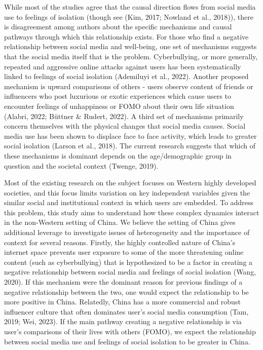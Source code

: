 \documentclass[]{interact}
\theoremstyle{plain}%
\theoremstyle{definition}
\theoremstyle{remark}
\begin{document}
While most of the studies agree that the causal direction flows from
social media use to feelings of isolation (though see (Kim, 2017;
Nowland et al., 2018)), there is disagreement among authors about the
specific mechanisms and causal pathways through which this relationship
exists. For those who find a negative relationship between social media
and well-being, one set of mechanisms suggests that the social media
itself that is the problem. Cyberbullying, or more generally, repeated
and aggressive online attacks against users has been systematically
linked to feelings of social isolation (Ademiluyi et al., 2022). Another
proposed mechanism is upward comparisons of others - users observe
content of friends or influencers who post luxurious or exotic
experiences which cause users to encounter feelings of unhappiness or
FOMO about their own life situation (Alabri, 2022; Büttner \& Rudert,
2022). A third set of mechanisms primarily concern themselves with the
physical changes that social media causes. Social media use has been
shown to displace face to face activity, which leads to greater social
isolation (Larson et al., 2018). The current research suggests that
which of these mechanisms is dominant depends on the age/demographic
group in question and the societal context (Twenge, 2019).

Most of the existing research on the subject focuses on Western highly
developed societies, and this focus limits variation on key independent
variables given the similar social and institutional context in which
users are embedded. To address this problem, this study aims to
understand how these complex dynamics interact in the non-Western
setting of China. We believe the setting of China gives additional
leverage to investigate issues of heterogeneity and the importance of
context for several reasons. Firstly, the highly controlled nature of
China's internet space prevents user exposure to some of the more
threatening online content (such as cyberbullying) that is hypothesized
to be a factor in creating a negative relationship between social media
and feelings of social isolation (Wang, 2020). If this mechanism were
the dominant reason for previous findings of a negative relationship
between the two, one would expect the relationship to be more positive
in China. Relatedly, China has a more commercial and robust influencer
culture that often dominates user's social media consumption (Tam, 2019;
Wei, 2023). If the main pathway creating a negative relationship is via
user's comparisons of their lives with others (FOMO), we expect the
relationship between social media use and feelings of social isolation
to be greater in China.
\end{document}

